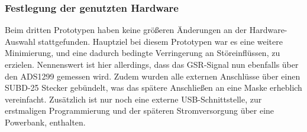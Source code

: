 \subsubsection{Festlegung der genutzten Hardware} \label{festlegung-subsubsec}

Beim dritten Prototypen haben keine größeren Änderungen an der Hardware-Auswahl stattgefunden. Hauptziel bei diesem Prototypen war es eine weitere Minimierung, und eine dadurch bedingte Verringerung an Störeinflüssen, zu erzielen. Nennenswert ist hier allerdings, dass das GSR-Signal nun ebenfalls über den ADS1299 gemessen wird. Zudem wurden alle externen Anschlüsse über einen SUBD-25 Stecker gebündelt, was das spätere Anschließen an eine Maske erheblich vereinfacht. Zusätzlich ist nur noch eine externe USB-Schnittstelle, zur erstmaligen Programmierung und der späteren Stromversorgung über eine Powerbank, enthalten.




